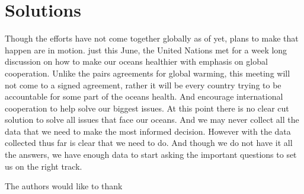 \documentclass[sigconf]{acmart}
\begin{document}
\section{Solutions}
Though the efforts have not come together globally as of yet, plans to make that happen are in motion. just this June, the United Nations met for a week long discussion on how to make our oceans healthier with emphasis on global cooperation.  Unlike the pairs agreements for global warming, this meeting will not come to a signed agreement, rather it will be every country trying to be accountable for some part of the oceans health.  And encourage international cooperation to help solve our biggest issues.
At this point there is no clear cut solution to solve all issues that face our oceans.  And we may never collect all the data that we need to make the most informed decision.  However with the data collected thus far is clear that we need to do. And though we do not have it all the answers, we have enough data to start asking the important questions to set us on the right track.  
\begin{acks}
  The authors would like to thank \cite{editor00}
\end{acks}
 


 
\end{document}
